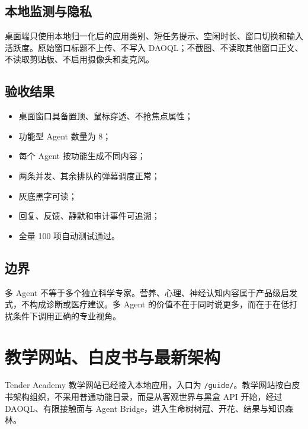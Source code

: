 \documentclass[UTF8,a4paper,11pt]{ctexart}
\begin{document}
\subsection{本地监测与隐私}

桌面端只使用本地归一化后的应用类别、短任务提示、空闲时长、窗口切换和输入活跃度。原始窗口标题不上传、不写入 DAOQL；不截图、不读取其他窗口正文、不读取剪贴板、不启用摄像头和麦克风。

\subsection{验收结果}

\begin{itemize}[leftmargin=2em]
\item 桌面窗口具备置顶、鼠标穿透、不抢焦点属性；
\item 功能型 Agent 数量为 8；
\item 每个 Agent 按功能生成不同内容；
\item 两条并发、其余排队的弹幕调度正常；
\item 灰底黑字可读；
\item 回复、反馈、静默和审计事件可追溯；
\item 全量 100 项自动测试通过。
\end{itemize}

\subsection{边界}

多 Agent 不等于多个独立科学专家。营养、心理、神经认知内容属于产品级启发式，不构成诊断或医疗建议。多 Agent 的价值不在于同时说更多，而在于在低打扰条件下调用正确的专业视角。

\section{教学网站、白皮书与最新架构}

Tender Academy 教学网站已经接入本地应用，入口为 \texttt{/guide/}。教学网站按白皮书架构组织，不采用普通功能目录，而是从客观世界与黑盒 API 开始，经过 DAOQL、有限接触面与 Agent Bridge，进入生命树树冠、开花、结果与知识森林。
\end{document}
